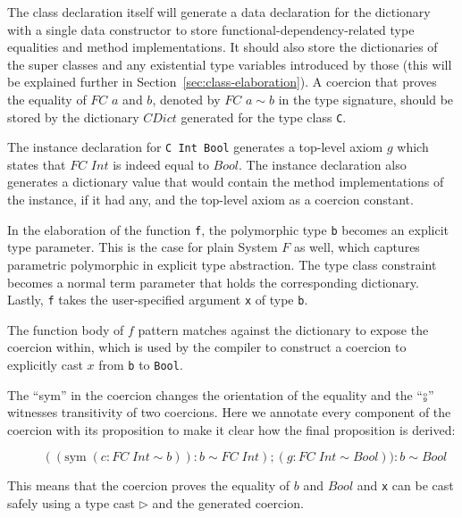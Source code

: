 The class declaration itself will generate a data declaration for the dictionary
with a single data constructor to store functional-dependency-related type
equalities and method implementations. It should also store the dictionaries of
the super classes and any existential type variables introduced by those (this
will be explained further in Section~\ref{sec:class-elaboration}).
A coercion that proves the equality of $FC$ $a$ and $b$, denoted by
$FC$ $a \sim b$ in the type signature, should be stored by the dictionary
$CDict$ generated for the type class \texttt{C}.

The instance declaration for \texttt{C Int Bool} generates a top-level axiom
$g$ which states that $FC$ $Int$ is indeed equal to $Bool$. The instance
declaration also generates a dictionary value that would contain the method
implementations of the instance, if it had any, and the top-level axiom as a
coercion constant.

In the elaboration of the function \texttt{f}, the polymorphic type \texttt{b}
becomes an explicit type parameter. This is the case for plain System $F$ as well,
which captures parametric polymorphic in explicit type abstraction.
The type class constraint becomes a
normal term parameter that holds the corresponding dictionary. Lastly,
\texttt{f} takes the user-specified argument \texttt{x} of type \texttt{b}.

The function body of $f$ pattern matches against the dictionary to expose the
coercion within, which is used by the compiler to construct a coercion to
explicitly cast $x$ from \texttt{b} to \texttt{Bool}.

The ``sym'' in the coercion changes the orientation of the equality and the
``$\fctrans$'' witnesses transitivity of two coercions. Here we annotate every
component of the coercion with its proposition to make it clear how the
final proposition is derived:

\[
\quad\quad((\text{sym} \; (c : FC \; Int \sim b)) : b \sim FC \; Int) ; (g : FC
\; Int \sim Bool) ) : b \sim Bool
\]

This means that the coercion proves the equality of $b$ and $Bool$ and
\texttt{x} can be cast safely using a type cast $\triangleright$ and the
generated coercion.
